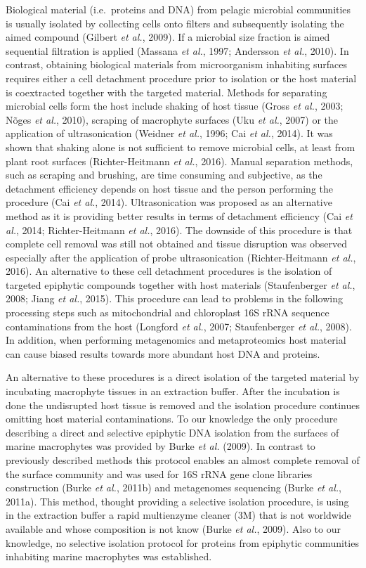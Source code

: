 \documentclass[12pt,]{article}
\begin{document}
Biological material (i.e.~proteins and DNA) from pelagic microbial
communities is usually isolated by collecting cells onto filters and
subsequently isolating the aimed compound (Gilbert \emph{et al.}, 2009).
If a microbial size fraction is aimed sequential filtration is applied
(Massana \emph{et al.}, 1997; Andersson \emph{et al.}, 2010). In
contrast, obtaining biological materials from microorganism inhabiting
surfaces requires either a cell detachment procedure prior to isolation
or the host material is coextracted together with the targeted material.
Methods for separating microbial cells form the host include shaking of
host tissue (Gross \emph{et al.}, 2003; Nõges \emph{et al.}, 2010),
scraping of macrophyte surfaces (Uku \emph{et al.}, 2007) or the
application of ultrasonication (Weidner \emph{et al.}, 1996; Cai
\emph{et al.}, 2014). It was shown that shaking alone is not sufficient
to remove microbial cells, at least from plant root surfaces
(Richter-Heitmann \emph{et al.}, 2016). Manual separation methods, such
as scraping and brushing, are time consuming and subjective, as the
detachment efficiency depends on host tissue and the person performing
the procedure (Cai \emph{et al.}, 2014). Ultrasonication was proposed as
an alternative method as it is providing better results in terms of
detachment efficiency (Cai \emph{et al.}, 2014; Richter-Heitmann
\emph{et al.}, 2016). The downside of this procedure is that complete
cell removal was still not obtained and tissue disruption was observed
especially after the application of probe ultrasonication
(Richter-Heitmann \emph{et al.}, 2016). An alternative to these cell
detachment procedures is the isolation of targeted epiphytic compounds
together with host materials (Staufenberger \emph{et al.}, 2008; Jiang
\emph{et al.}, 2015). This procedure can lead to problems in the
following processing steps such as mitochondrial and chloroplast 16S
rRNA sequence contaminations from the host (Longford \emph{et al.},
2007; Staufenberger \emph{et al.}, 2008). In addition, when performing
metagenomics and metaproteomics host material can cause biased results
towards more abundant host DNA and proteins.

An alternative to these procedures is a direct isolation of the targeted
material by incubating macrophyte tissues in an extraction buffer. After
the incubation is done the undisrupted host tissue is removed and the
isolation procedure continues omitting host material contaminations. To
our knowledge the only procedure describing a direct and selective
epiphytic DNA isolation from the surfaces of marine macrophytes was
provided by Burke \emph{et al.} (2009). In contrast to previously
described methods this protocol enables an almost complete removal of
the surface community and was used for 16S rRNA gene clone libraries
construction (Burke \emph{et al.}, 2011b) and metagenomes sequencing
(Burke \emph{et al.}, 2011a). This method, thought providing a selective
isolation procedure, is using in the extraction buffer a rapid
multienzyme cleaner (3M) that is not worldwide available and whose
composition is not know (Burke \emph{et al.}, 2009). Also to our
knowledge, no selective isolation protocol for proteins from epiphytic
communities inhabiting marine macrophytes was established.
\end{document}
